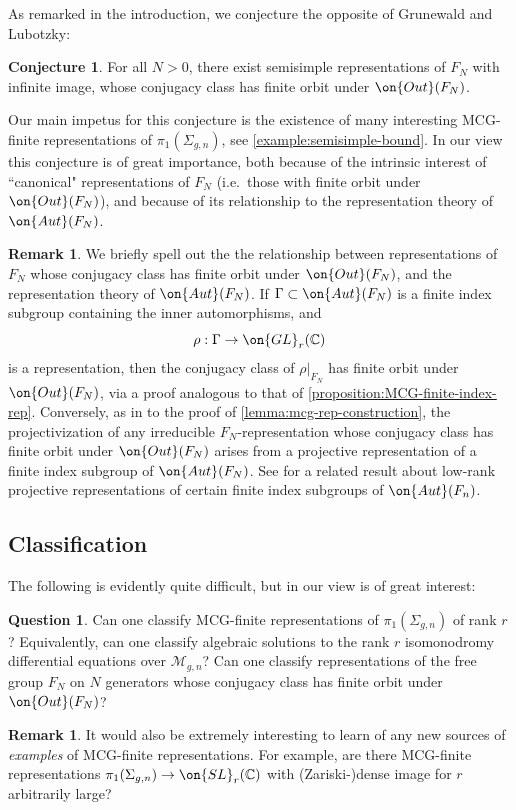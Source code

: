 \documentclass[12 pt]{amsart}
\theoremstyle{plain}
\theoremstyle{definition}
\newtheorem{remark}[subsubsection]{Remark}
\newtheorem{question}[subsubsection]{Question}
\newtheorem{conjecture}[subsubsection]{Conjecture}
\theoremstyle{remark}
\numberwithin{equation}{section}
\begin{document}
As remarked in the introduction, we conjecture the opposite of Grunewald and Lubotzky:
\begin{conjecture}
	\label{conjecture:infinite-image-semisimple}
For all $N>0$, there exist semisimple representations of $F_N$ with infinite image, whose conjugacy class has finite orbit under $\on{Out}(F_N)$. 
\end{conjecture}
Our main impetus for this conjecture is the existence of many interesting
MCG-finite representations of $\pi_1(\Sigma_{g,n})$, see \autoref{example:semisimple-bound}. In our view this conjecture is of great importance, both because of the intrinsic interest of ``canonical" representations of $F_N$ (i.e.~those with finite orbit under $\on{Out}(F_N)$), and because of its relationship to the representation theory of $\on{Aut}(F_N)$. 

\begin{remark}
We briefly spell out the the relationship between representations of $F_N$ whose conjugacy class has finite orbit under $\on{Out}(F_N)$, and the representation theory of
$\on{Aut}(F_N)$.
If $\Gamma\subset \on{Aut}(F_N)$ is a finite index subgroup containing the inner automorphisms, and
$$\rho:\Gamma\to \on{GL}_r(\mathbb{C})$$ is a representation, then the conjugacy
class of $\rho|_{F_N}$ has finite orbit under $\on{Out}(F_N)$, via a proof
analogous to that of
\autoref{proposition:MCG-finite-index-rep}. Conversely, as in to the proof of \autoref{lemma:mcg-rep-construction}, the projectivization of any irreducible $F_N$-representation whose conjugacy class has finite orbit under $\on{Out}(F_N)$ arises from a projective representation of a finite index subgroup of $\on{Aut}(F_N)$. See \cite[Theorem 7.12]{baumeister-kielak-pierro} for a related result about low-rank projective representations of certain finite index subgroups of $\on{Aut}(F_n)$.
\end{remark}
\subsection{Classification}
The following is evidently quite difficult, but in our view is of great interest:
\begin{question}
Can one classify MCG-finite representations of $\pi_1(\Sigma_{g,n})$	 of rank $r$? Equivalently, can one classify algebraic solutions to the rank $r$ isomonodromy differential equations over $\mathscr{M}_{g,n}$? Can one classify representations of the free group $F_N$ on $N$ generators whose conjugacy class has finite orbit under $\on{Out}(F_N)$?
\end{question}
\begin{remark}
	\label{remark:}
It would also be extremely interesting to learn of any new sources of
\emph{examples} of MCG-finite representations. For example, are there MCG-finite representations $\pi_1(\Sigma_{g,n})\to \on{SL}_r(\mathbb{C})$ with (Zariski-)dense image for $r$ arbitrarily large?
\end{remark}
\end{document}
